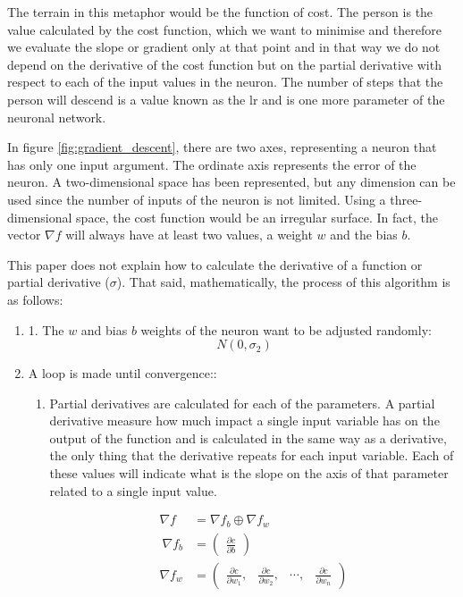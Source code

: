 \begin{itemize}
The terrain in this metaphor would be the function of cost. The person is the value calculated by the cost function, which we want to minimise and therefore we evaluate the slope or gradient only at that point and in that way we do not depend on the derivative of the cost function but on the partial derivative with respect to each of the input values in the neuron. The number of steps that the person will descend is a value known as the \acrlong{lr} and is one more parameter of the neuronal network.
\newline

In figure \ref{fig:gradient_descent}, there are two axes, representing a neuron that has only one input argument. The ordinate axis represents the error of the neuron. A two-dimensional space has been represented, but any dimension can be used since the number of inputs of the neuron is not limited. Using a three-dimensional space, the cost function would be an irregular surface. In fact, the vector $\nabla f$ will always have at least two values, a weight $w$ and the bias $b$.
\newline

This paper does not explain how to calculate the derivative of a function or partial derivative ($\sigma$). That said, mathematically, the process of this algorithm is as follows:

\begin{enumerate}
\item 1.	The $w$ and bias $b$ weights of the neuron want to be adjusted randomly:
\begin{equation}
    ~N(0, \sigma_2)
\end{equation}

\item A loop is made until convergence::
\begin{enumerate}

\item Partial derivatives are calculated for each of the parameters. A partial derivative measure how much impact a single input variable has on the output of the function and is calculated in the same way as a derivative, the only thing that the derivative repeats for each input variable. Each of these values will indicate what is the slope on the axis of that parameter related to
a single input value.


\begin{equation}
    \begin{split}
    \nabla f &= \nabla f_b \oplus \nabla f_w \\\
    \nabla f_b &= \begin{pmatrix} \frac{\partial c}{\partial b} \end{pmatrix}\\
    \nabla f_w &= \begin{pmatrix} \frac{\partial c}{\partial w_1}, & \frac{\partial c}{\partial w_2}, & \cdots , &  \frac{\partial c}{\partial w_n} \end{pmatrix}
  \end{split}
  \label{eqn:gradients}
\end{equation}



\end{enumerate}
\end{enumerate}
\end{itemize}
